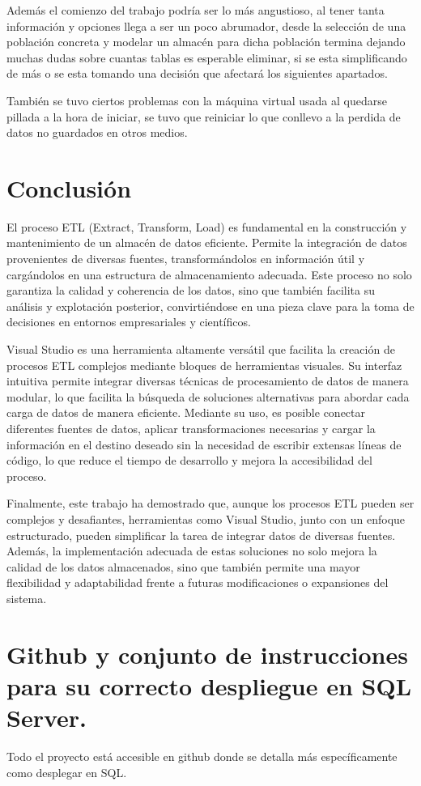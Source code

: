 \documentclass[12pt, a4paper, twoside]{article}
\begin{document}
	Además el comienzo del trabajo podría ser lo más angustioso, al tener tanta información y opciones llega a ser un poco abrumador, desde la selección de una población concreta y modelar un almacén para dicha población termina dejando muchas dudas sobre cuantas tablas es esperable eliminar, si se esta simplificando de más o se esta tomando una decisión que afectará los siguientes apartados. 
	
	También se tuvo ciertos problemas con la máquina virtual usada al quedarse pillada a la hora de iniciar, se tuvo que reiniciar lo que conllevo a la perdida de datos no guardados en otros medios.
	
	\section{Conclusión}
	
	El proceso ETL (Extract, Transform, Load) es fundamental en la construcción y mantenimiento de un almacén de datos eficiente. Permite la integración de datos provenientes de diversas fuentes, transformándolos en información útil y cargándolos en una estructura de almacenamiento adecuada. Este proceso no solo garantiza la calidad y coherencia de los datos, sino que también facilita su análisis y explotación posterior, convirtiéndose en una pieza clave para la toma de decisiones en entornos empresariales y científicos.
	
	Visual Studio es una herramienta altamente versátil que facilita la creación de procesos ETL complejos mediante bloques de herramientas visuales. Su interfaz intuitiva permite integrar diversas técnicas de procesamiento de datos de manera modular, lo que facilita la búsqueda de soluciones alternativas para abordar cada carga de datos de manera eficiente. Mediante su uso, es posible conectar diferentes fuentes de datos, aplicar transformaciones necesarias y cargar la información en el destino deseado sin la necesidad de escribir extensas líneas de código, lo que reduce el tiempo de desarrollo y mejora la accesibilidad del proceso.
	
	Finalmente, este trabajo ha demostrado que, aunque los procesos ETL pueden ser complejos y desafiantes, herramientas como Visual Studio, junto con un enfoque estructurado, pueden simplificar la tarea de integrar datos de diversas fuentes. Además, la implementación adecuada de estas soluciones no solo mejora la calidad de los datos almacenados, sino que también permite una mayor flexibilidad y adaptabilidad frente a futuras modificaciones o expansiones del sistema.
	


	\section{Github y conjunto de instrucciones para su correcto despliegue en SQL Server.}

	Todo el proyecto está accesible en github \cite{depab2024} donde se detalla más específicamente como desplegar en SQL.
	\printbibliography
	
	
	
	
\end{document}
